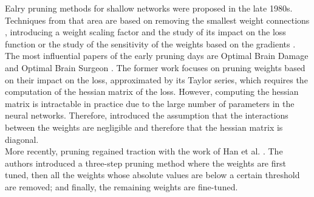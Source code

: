 Ealry pruning methods for shallow networks were proposed in the late 1980s.
Techniques from that area are based on removing the smallest weight connections
\cite{janowsky1989pruning}, introducing a weight scaling factor and the study of
its impact on the loss function \cite{DBLP:conf/nips/MozerS88} or the study of
the sensitivity of the weights based on the gradients
\cite{DBLP:journals/tnn/Karnin90}. The most influential papers of the early
pruning days are Optimal Brain Damage \cite{DBLP:conf/nips/CunDS89} and Optimal
Brain Surgeon
\cite{DBLP:conf/nips/HassibiS92,DBLP:conf/nips/HassibiSW93,DBLP:conf/icnn/HassibiSW93}.
The former work focuses on pruning weights based on their impact on the loss,
approximated by its Taylor series, which requires the computation of the hessian
matrix of the loss. However, computing the hessian matrix is intractable in
practice due to the large number of parameters in the neural networks.
Therefore, \citeauthor{DBLP:conf/icnn/HassibiSW93}
\cite{DBLP:conf/icnn/HassibiSW93} introduced the assumption that the
interactions between the weights are negligible and therefore that the hessian
matrix is diagonal.\\


More recently, pruning regained traction with the work of Han et al.
\cite{DBLP:conf/nips/HanPTD15}. The authors introduced a three-step pruning
method where the weights are first tuned, then all the weights whose absolute
values are below a certain threshold are removed; and finally, the remaining weights
are fine-tuned. \\


